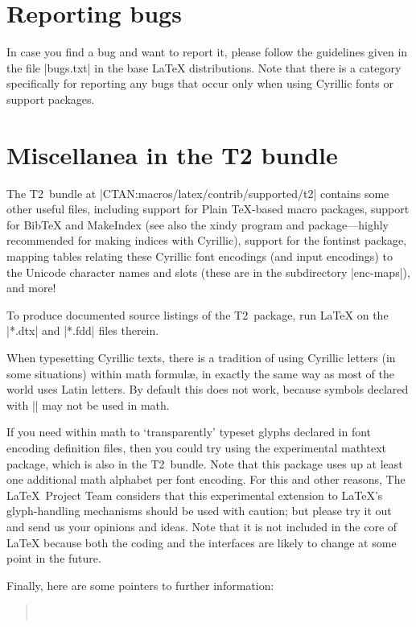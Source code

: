 \documentclass{ltxguide}[1999/02/28]
\begin{document}
\section{Reporting bugs}

In case you find a bug and want to report it, please follow the
guidelines given in the file |bugs.txt| in the base \LaTeX{}
distributions.  Note that there is a category specifically for
reporting any bugs that occur only when using Cyrillic fonts or
support packages.


\section{Miscellanea in the \textsf{T2} bundle}
\label{t2m}

The \textsf{T2}~bundle at |CTAN:macros/latex/contrib/supported/t2|
contains some other useful files, including support for Plain
\TeX{}-based macro packages, support for Bib\TeX{} and MakeIndex (see
also the \textsf{xindy} program and package---highly recommended for
making indices with Cyrillic), support for the \textsf{fontinst}
package, mapping tables relating these Cyrillic font encodings (and
input encodings) to the Unicode character names and slots (these are
in the subdirectory |enc-maps|), and more!

To produce documented source listings of the \textsf{T2}~package, run
\LaTeX{} on the |*.dtx| and |*.fdd| files therein.

When typesetting Cyrillic texts, there is a tradition of using
Cyrillic letters (in some situations) within math formul\ae, in
exactly the same way as most of the world uses Latin letters.
By default this does not work, because symbols declared with
|\DeclareTextSymbol| may not be used in math.

If you need within math to `transparently' typeset glyphs declared in
font encoding definition files, then you could try using the
experimental \textsf{mathtext} package, which is also in the
\textsf{T2}~bundle.  Note that this package uses up at least one
additional math alphabet per font encoding.  For this and other
reasons, The \LaTeX\ Project Team considers that this experimental
extension to \LaTeX{}'s glyph-handling mechanisms should be used with
caution; but please try it out and send us your opinions and ideas.
Note that it is not included in the core of \LaTeX{} because both the
coding and the interfaces are likely to change at some point in the
future.

Finally, here are some pointers to further information:

\begin{quote}
  \\
\end{quote}
\end{document}
